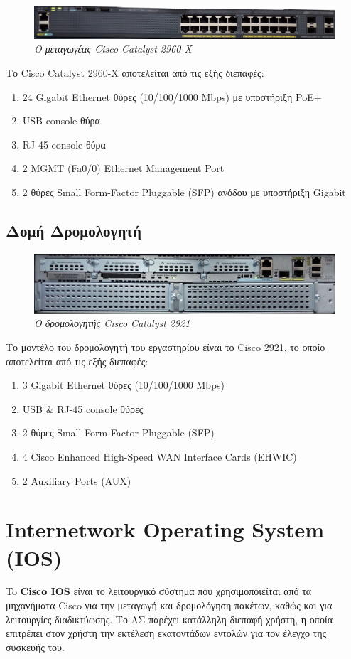 \documentclass[12pt]{article}
\begin{document}
\begin{figure}[H]
	\centering
	\includegraphics[scale=0.125]{c2960x-edited.jpg}
	\caption{\textit{Ο μεταγωγέας Cisco Catalyst 2960-X}}
\end{figure}
Το Cisco Catalyst 2960-X αποτελείται από τις εξής διεπαφές: 
\begin{enumerate}
	\setlength\itemsep{-0.1cm}
	\item 24 Gigabit Ethernet θύρες (10/100/1000 Mbps) με υποστήριξη PoE+
	\item USB console θύρα
	\item RJ-45 console θύρα
	\item 2 MGMT (Fa0/0) Ethernet Management Port
	\item 2 θύρες Small Form-Factor Pluggable (SFP) ανόδου με υποστήριξη Gigabit
\end{enumerate}

\subsection{Δομή Δρομολογητή}
\begin{figure}[H]
	\centering
	\includegraphics[scale=0.125]{c2921.jpg}
	\caption{\textit{Ο δρομολογητής Cisco Catalyst 2921}}
\end{figure}
Το μοντέλο του δρομολογητή του εργαστηρίου είναι το Cisco 2921, το οποίο αποτελείται από τις εξής διεπαφές:
\begin{enumerate}
	\setlength\itemsep{-0.1cm}
	\item 3 Gigabit Ethernet θύρες (10/100/1000 Mbps)
	\item USB \& RJ-45 console θύρες
	\item 2 θύρες Small Form-Factor Pluggable (SFP)
	\item 4 Cisco Enhanced High-Speed WAN Interface Cards (EHWIC)
	\item 2 Auxiliary Ports (AUX)
\end{enumerate} 

\section{Internetwork Operating System (IOS)}
To \textbf{Cisco IOS} είναι το λειτουργικό σύστημα που χρησιμοποιείται από τα μηχανήματα Cisco για την μεταγωγή και δρομολόγηση πακέτων, καθώς και για λειτουργίες διαδικτύωσης. Το ΛΣ παρέχει κατάλληλη διεπαφή χρήστη, η οποία επιτρέπει στον χρήστη την εκτέλεση εκατοντάδων εντολών για τον έλεγχο της συσκευής του.
\end{document}
